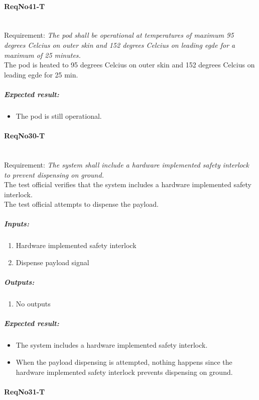 \paragraph{ReqNo41-T}\mbox{}\\ %
Requirement: \textit{The pod shall be operational at temperatures of maximum 95 degrees Celcius on outer skin and 152 degrees Celcius on leading egde for a maximum of 25 minutes.}\\

The pod is heated to 95 degrees Celcius on outer skin and 152 degrees Celcius on leading egde for 25 min. 

	\subparagraph{Expected result:}
	\begin{itemize}
	\item The pod is still operational.
	\end{itemize}

\paragraph{ReqNo30-T}\mbox{}\\ %
Requirement: \textit{The system shall include a hardware implemented safety interlock to prevent dispensing on ground.}\\

The test official verifies that the system includes a hardware implemented safety interlock. \\
The test official attempts to dispense the payload.  
\subparagraph{Inputs:}
	\begin{enumerate}
	\item Hardware implemented safety interlock
	\item Dispense payload signal
	\end{enumerate}
\subparagraph{Outputs:}
	\begin{enumerate}
	\item No outputs
	\end{enumerate}
\subparagraph{Expected result:}
	\begin{itemize}
	\item The system includes a hardware implemented safety interlock.
	\item When the payload dispensing is attempted, nothing happens since the hardware implemented safety interlock prevents dispensing on ground.
	\end{itemize}

\paragraph{ReqNo31-T}\mbox{}\\ %

